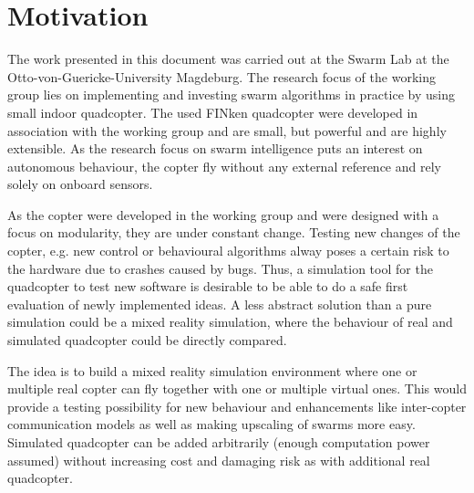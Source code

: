 

\section{Motivation}

The work presented in this document was carried out at the Swarm Lab at the Otto-von-Guericke-University Magdeburg. The research focus of the working group lies on implementing and investing swarm algorithms in practice by using small indoor quadcopter. The used FINken quadcopter were developed in association with the working group and are small, but powerful and are highly extensible. As the research focus on swarm intelligence puts an interest on autonomous behaviour, the copter fly without any external reference and rely solely on onboard sensors.

As the copter were developed in the working group and were designed with a focus on modularity, they are under constant change. Testing new changes of the copter, e.g. new control or behavioural algorithms alway poses a certain risk to the hardware due to crashes caused by bugs. Thus, a simulation tool for the quadcopter to test new software is desirable to be able to do a safe first evaluation of newly implemented ideas. A less abstract solution than a pure simulation could be a mixed reality simulation, where the behaviour of real and simulated quadcopter could be directly compared.

The idea is to build a mixed reality simulation environment where one or multiple real copter can fly together with one or multiple virtual ones. This would provide a testing possibility for new behaviour and enhancements like inter-copter communication models as well as making upscaling of swarms more easy. Simulated quadcopter can be added arbitrarily (enough computation power assumed) without increasing cost and damaging risk as with additional real quadcopter. 

